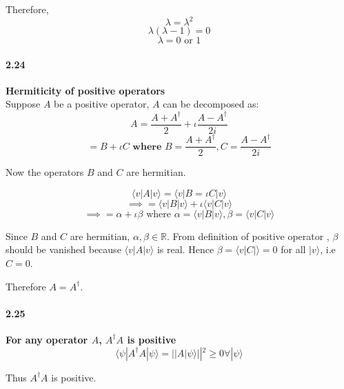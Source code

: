 Therefore,
$$ \lambda = \lambda^2$$
$$ \lambda(\lambda-1) = 0$$
$$\lambda = 0 \text{ or } 1$$

\paragraph{2.24} \textbf{Hermiticity of positive operators}%
\\
Suppose $A$ be a positive operator, $A$ can be decomposed as:
$$ A = \frac{A + A^{\dagger}}{2} + \iota \frac{A - A^{\dagger}}{2i}$$
$$ = B + \iota C \textbf{ where } B = \frac{A + A^{\dagger}}{2}, C = \frac{A - A^{\dagger}}{2i}$$

Now the operators $B$ and $C$ are hermitian.

$$ \langle v | A | v\rangle = \langle v |B = \iota C| v \rangle$$
$$ \implies = \langle v |B | v \rangle + \iota \langle v |C|v\rangle$$
$$ \implies = \alpha + \iota \beta \text{ where } \alpha = \langle v |B | v\rangle, \beta = \langle v | C | v\rangle$$

Since $B$ and $C$ are hermitian, $\alpha, \beta \in \mathbb{R}$. From definition of positive operator , $\beta$ should be vanished because $\langle v | A | v\rangle $ is real. Hence $\beta = \langle v |C|\rangle = 0$ for all $|v\rangle$, i.e $C=0$.

Therefore $A = A^{\dagger}$.


\paragraph{2.25} \textbf{For any operator $A$, $A^{\dagger}A$ is positive}%
\\

$$\langle \psi | A^{\dagger } A |\psi\rangle = || A |\psi\rangle ||^2 \ge 0 \forall |\psi\rangle$$

Thus $A^{\dagger} A $ is positive.


